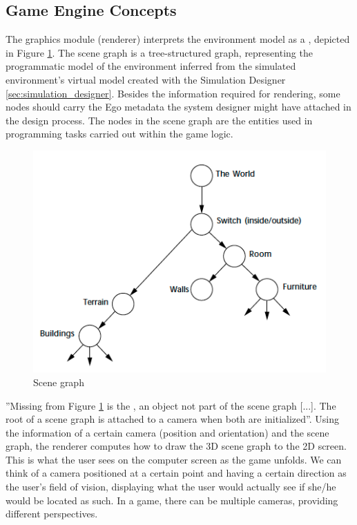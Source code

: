 \subsection{Game Engine Concepts}\label{subsec:game_engine_concepts}
The graphics module (renderer) interprets the environment model as a \emph{}, depicted in Figure \ref{fig:scene_graph}. The scene graph is a tree-structured graph, representing the programmatic model of the environment inferred from the simulated environment's virtual model created with the Simulation Designer \ref{sec:simulation_designer}. Besides the information required for rendering, some nodes should carry the Ego metadata the system designer might have attached in the design process. The nodes in the scene graph are the entities used in programming tasks carried out within the game logic.
\begin{figure}[H]
	\centering
	\includegraphics[width=\linewidth]{gfx/Chapter3/scene_graph}
	\caption{Scene graph \cite{shantz1998designing}}
	\label{fig:scene_graph}
\end{figure}

''Missing from Figure \ref{fig:scene_graph} is the \emph{}, an object not part of the scene graph [...]. The root of a scene graph is attached to a camera when both are initialized''\cite{shantz1998designing}. Using the information of a certain camera (position and orientation) and the scene graph, the renderer computes how to draw the 3D scene graph to the 2D screen. This is what the user sees on the computer screen as the game unfolds. We can think of a camera positioned at a certain point and having a certain direction as the user's field of vision, displaying what the user would actually see if she/he would be located as such. In a game, there can be multiple cameras, providing different perspectives.\\

